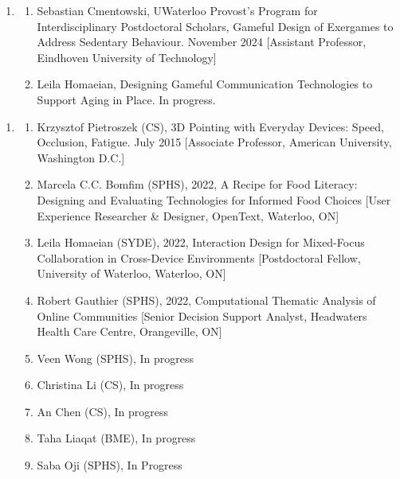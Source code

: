 \documentclass[12pt]{article}
\begin{document}
\begin{enumerate}


    \begin{enumerate}
        \item[PDF]
        \begin{enumerate}[label=\arabic*.]
            \item Sebastian Cmentowski, UWaterloo Provost's Program for Interdisciplinary Postdoctoral Scholars, Gameful Design of Exergames to Address Sedentary Behaviour. November 2024 [Assistant Professor, Eindhoven University of Technology]
            \item Leila Homaeian, Designing Gameful Communication Technologies to Support Aging in Place. In progress.
        \end{enumerate}
    \end{enumerate}
    


    \begin{enumerate}
        \item[PhD]
        \begin{enumerate}[label=\arabic*.]
            \item Krzysztof Pietroszek (CS), 3D Pointing with Everyday Devices: Speed, Occlusion, Fatigue. July 2015 [Associate Professor, American University, Washington D.C.]
            \item Marcela C.C. Bomfim (SPHS), 2022, A Recipe for Food Literacy: Designing and Evaluating Technologies for Informed Food Choices [User Experience Researcher \& Designer, OpenText, Waterloo, ON]
            \item Leila Homaeian (SYDE), 2022, Interaction Design for Mixed-Focus Collaboration in Cross-Device Environments [Postdoctoral Fellow, University of Waterloo, Waterloo, ON]
            \item Robert Gauthier (SPHS), 2022, Computational Thematic Analysis of Online Communities [Senior Decision Support Analyst, Headwaters Health Care Centre, Orangeville, ON]
            \item Veen Wong (SPHS), In progress
            \item Christina Li (CS), In progress
            \item An Chen (CS), In progress
            \item Taha Liaqat (BME), In progress
            \item Saba Oji (SPHS), In Progress
        \end{enumerate}
    \end{enumerate}


\end{enumerate}
\end{document}
